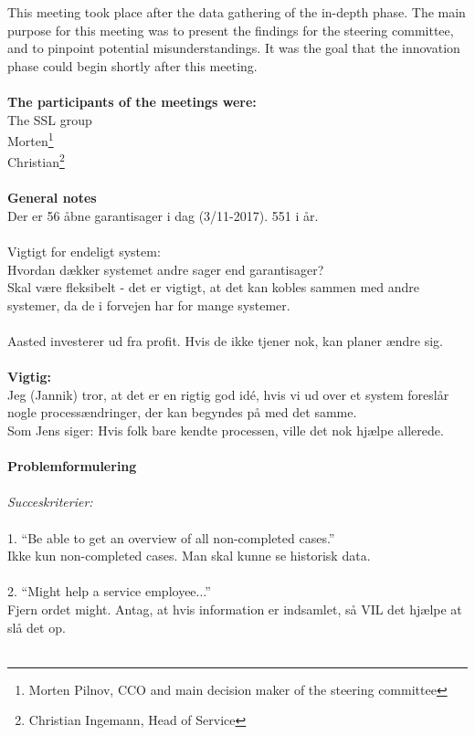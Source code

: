 This meeting took place after the data gathering of the in-depth phase. The main purpose for this meeting was to present the findings for the steering committee, and to pinpoint potential misunderstandings. It was the goal that the innovation phase could begin shortly after this meeting.\\\\ 
\textbf{The participants of the meetings were:}\\
The SSL group\\
Morten\footnote{Morten Pilnov, CCO and main decision maker of the steering committee}\\
Christian\footnote{Christian Ingemann, Head of Service}
\\\\
\textbf{General notes}\\
Der er 56 åbne garantisager i dag (3/11-2017). 551 i år.\\\\
Vigtigt for endeligt system:\\
Hvordan dækker systemet andre sager end garantisager?\\
Skal være fleksibelt - det er vigtigt, at det kan kobles sammen med andre systemer, da de i forvejen har for mange systemer.\\\\
Aasted investerer ud fra profit. Hvis de ikke tjener nok, kan planer ændre sig.\\\\
\textbf{Vigtig:}\\ 
Jeg (Jannik) tror, at det er en rigtig god idé, hvis vi ud over et system foreslår nogle processændringer, der kan begyndes på med det samme.\\
Som Jens siger: Hvis folk bare kendte processen, ville det nok hjælpe allerede.\\\\
\textbf{Problemformulering}\\\\
\textit{Succeskriterier:}\\\\
1. “Be able to get an overview of all non-completed cases.”\\
Ikke kun non-completed cases. Man skal kunne se historisk data.\\\\
2. “Might help a service employee...”\\
Fjern ordet might. Antag, at hvis information er indsamlet, så VIL det hjælpe at slå det op.\\\\
